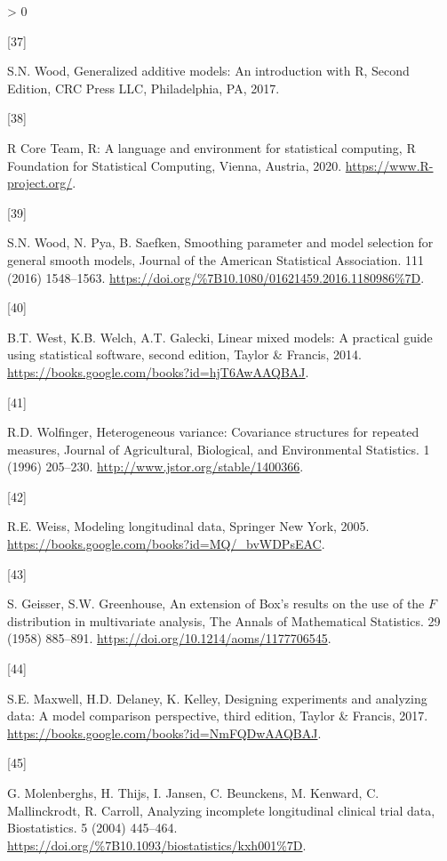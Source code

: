 \documentclass[
]{article}
\newlength{\cslhangindent}
\newlength{\csllabelwidth}
\newenvironment{CSLReferences}[2] %
 {%
  \setlength{\parindent}{0pt}
  \ifodd #1 \everypar{\setlength{\hangindent}{\cslhangindent}}\ignorespaces\fi
  \ifnum #2 > 0
  \setlength{\parskip}{#2\baselineskip}
  \fi
 }%
 {}
\newcommand{\CSLLeftMargin}[1]{\parbox[t]{\csllabelwidth}{#1}}
\newcommand{\CSLRightInline}[1]{\parbox[t]{\linewidth - \csllabelwidth}{#1}\break}
\begin{document}
\begin{CSLReferences}{0}{0}
\leavevmode\hypertarget{ref-wood2017}{}%
\CSLLeftMargin{{[}37{]} }
\CSLRightInline{S.N. Wood, {Generalized additive models: An introduction with R, Second Edition}, CRC Press LLC, Philadelphia, PA, 2017.}

\leavevmode\hypertarget{ref-r}{}%
\CSLLeftMargin{{[}38{]} }
\CSLRightInline{R Core Team, R: A language and environment for statistical computing, R Foundation for Statistical Computing, Vienna, Austria, 2020. \url{https://www.R-project.org/}.}

\leavevmode\hypertarget{ref-wood2016}{}%
\CSLLeftMargin{{[}39{]} }
\CSLRightInline{S.N. Wood, N. Pya, B. Saefken, Smoothing parameter and model selection for general smooth models, {Journal of the American Statistical Association}. {111} (2016) 1548--1563. \url{https://doi.org/\%7B10.1080/01621459.2016.1180986\%7D}.}

\leavevmode\hypertarget{ref-west2014}{}%
\CSLLeftMargin{{[}40{]} }
\CSLRightInline{B.T. West, K.B. Welch, A.T. Galecki, Linear mixed models: A practical guide using statistical software, second edition, Taylor \& Francis, 2014. \url{https://books.google.com/books?id=hjT6AwAAQBAJ}.}

\leavevmode\hypertarget{ref-wolfinger1996}{}%
\CSLLeftMargin{{[}41{]} }
\CSLRightInline{R.D. Wolfinger, Heterogeneous variance: Covariance structures for repeated measures, Journal of Agricultural, Biological, and Environmental Statistics. 1 (1996) 205--230. \url{http://www.jstor.org/stable/1400366}.}

\leavevmode\hypertarget{ref-weiss2005}{}%
\CSLLeftMargin{{[}42{]} }
\CSLRightInline{R.E. Weiss, Modeling longitudinal data, Springer New York, 2005. \url{https://books.google.com/books?id=MQ/_bvWDPsEAC}.}

\leavevmode\hypertarget{ref-geisser1958}{}%
\CSLLeftMargin{{[}43{]} }
\CSLRightInline{S. Geisser, S.W. Greenhouse, {An extension of Box's results on the use of the \(F\) distribution in multivariate analysis}, The Annals of Mathematical Statistics. 29 (1958) 885--891. \url{https://doi.org/10.1214/aoms/1177706545}.}

\leavevmode\hypertarget{ref-maxwell2017}{}%
\CSLLeftMargin{{[}44{]} }
\CSLRightInline{S.E. Maxwell, H.D. Delaney, K. Kelley, Designing experiments and analyzing data: A model comparison perspective, third edition, Taylor \& Francis, 2017. \url{https://books.google.com/books?id=NmFQDwAAQBAJ}.}

\leavevmode\hypertarget{ref-molenberghs2004}{}%
\CSLLeftMargin{{[}45{]} }
\CSLRightInline{G. Molenberghs, H. Thijs, I. Jansen, C. Beunckens, M. Kenward, C. Mallinckrodt, R. Carroll, {Analyzing incomplete longitudinal clinical trial data}, {Biostatistics}. {5} (2004) 445--464. \url{https://doi.org/\%7B10.1093/biostatistics/kxh001\%7D}.}


\end{CSLReferences}
\end{document}
